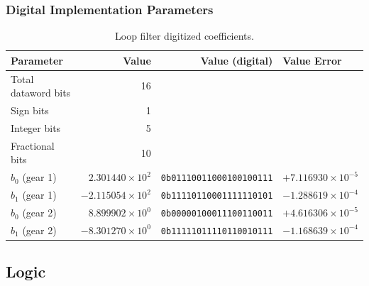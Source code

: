 		\subsubsection{Digital Implementation Parameters}
		\begin{table}[h!]
			\centering
			\def\arraystretch{1.5}		
			\setlength\arrayrulewidth{0.75pt}
			\setlength{\tabcolsep}{1em} %
			\begin{tabular}{|l|r|r|l|}
				\hline 
				\rule[-1ex]{0pt}{2.5ex} \cellcolor{gray!40}\textbf{Parameter} & \cellcolor{gray!40}\textbf{Value} & \cellcolor{gray!40}\textbf{Value (digital) } & \cellcolor{gray!40}\textbf{Value Error}\\ 
				\hline 
				\rule[-1ex]{0pt}{2.5ex} Total dataword bits  & 16 & & \\ 
				\hline 
				\rule[-1ex]{0pt}{2.5ex} Sign bits  & 1 & & \\ 
				\hline 
				\rule[-1ex]{0pt}{2.5ex} Integer bits & 5 & & \\ 
				\hline 
				\rule[-1ex]{0pt}{2.5ex} Fractional bits  & 10 & & \\ 
				\hline 
				\rule[-1ex]{0pt}{2.5ex} \textbf{$b_0$} {\color{red} (gear 1)} & $2.301440\times10^2$ & \texttt{0b01110011000100100111}  & $+7.116930\times10^{-5}$\\
				\hline 
				\rule[-1ex]{0pt}{2.5ex} \textbf{$b_1$} {\color{red} (gear 1)} & $-2.115054\times10^2$ & \texttt{0b11110110001111110101}  & $-1.288619\times10^{-4}$\\
				\hline 
				\rule[-1ex]{0pt}{2.5ex} \textbf{$b_0$} {\color{blue} (gear 2)} & $8.899902\times10^0$ & \texttt{0b00000100011100110011}  & $+4.616306\times10^{-5}$\\
				\hline 
				\rule[-1ex]{0pt}{2.5ex} \textbf{$b_1$} {\color{blue} (gear 2)} & $-8.301270\times10^0$ & \texttt{0b11111011110110010111}  & $-1.168639\times10^{-4}$\\
				\hline 
			\end{tabular} 
			\caption{Loop filter digitized coefficients.}
			\label{dig_filter_params_fast}
		\end{table}  

\FloatBarrier\subsection{Logic}

